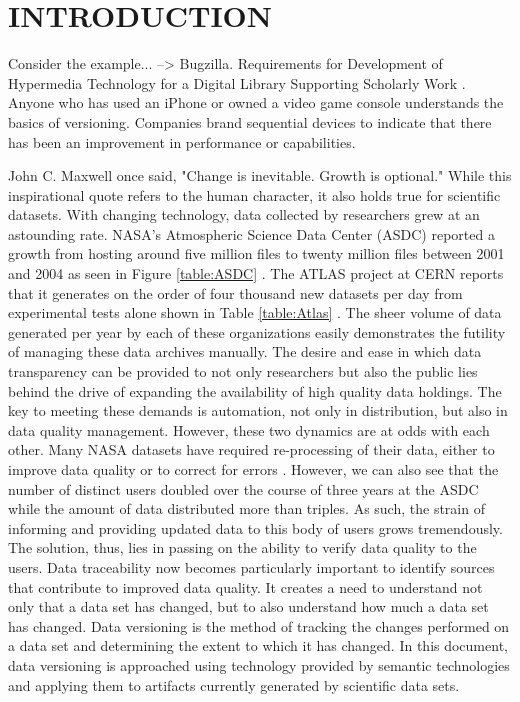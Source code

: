 
\chapter{INTRODUCTION}

Consider the example... --> Bugzilla.
Requirements for Development of Hypermedia Technology for a Digital Library Supporting Scholarly Work \cite{Wiil:2000:RDH:338407.338517}.
Anyone who has used an iPhone or owned a video game console understands the basics of versioning.
Companies brand sequential devices to indicate that there has been an improvement in performance or capabilities.


John C. Maxwell once said, "Change is inevitable.  Growth is optional."
While this inspirational quote refers to the human character, it also holds true for scientific datasets.
With changing technology, data collected by researchers grew at an astounding rate.
NASA's Atmospheric Science Data Center (ASDC) reported a growth from hosting around five million files to twenty million files between 2001 and 2004 as seen in Figure \ref{table:ASDC} \cite{Barkstrom_digitallibrary}.
The ATLAS project at CERN reports that it generates on the order of four thousand new datasets per day from experimental tests alone shown in Table \ref{table:Atlas} \cite{Branco2008}.
The sheer volume of data generated per year by each of these organizations easily demonstrates the futility of managing these data archives manually.
The desire and ease in which data transparency can be provided to not only researchers but also the public lies behind the drive of expanding the availability of high quality data holdings.
The key to meeting these demands is automation, not only in distribution, but also in data quality management.
However, these two dynamics are at odds with each other.
Many NASA datasets have required re-processing of their data, either to improve data quality or to correct for errors \cite{barkstrom2014earth}.
However, we can also see that the number of distinct users doubled over the course of three years at the ASDC while the amount of data distributed more than triples.
As such, the strain of informing and providing updated data to this body of users grows tremendously.
The solution, thus, lies in passing on the ability to verify data quality to the users.
Data traceability now becomes particularly important to identify sources that contribute to improved data quality.
It creates a need to understand not only that a data set has changed, but to also understand how much a data set has changed.
Data versioning is the method of tracking the changes performed on a data set and determining the extent to which it has changed.
In this document, data versioning is approached using technology provided by semantic technologies and applying them to artifacts currently generated by scientific data sets.

